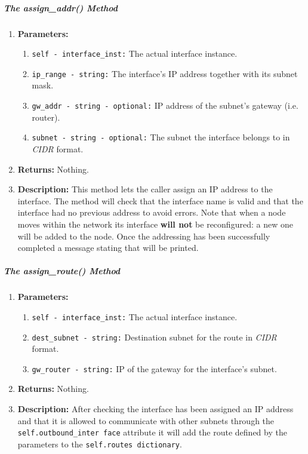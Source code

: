         \subparagraph{The assign\_addr() Method}
            \begin{enumerate}
                \item \textbf{Parameters:}
                \begin{enumerate}
                    \item \texttt{self - interface\_inst:} The actual interface instance.
                    \item \texttt{ip\_range - string:} The interface's IP address together with its subnet mask.
                    \item \texttt{gw\_addr - string - optional:} IP address of the subnet's gateway (i.e. router).
                    \item \texttt{subnet - string - optional:} The subnet the interface belongs to in \textit{CIDR} format.
                \end{enumerate}
                \item \textbf{Returns:} Nothing.
                \item \textbf{Description:} This method lets the caller assign an IP address to the interface. The method will check that the interface name is valid and that the interface had no previous address to avoid errors. Note that when a node moves within the network its interface \textbf{will not} be reconfigured: a new one will be added to the node. Once the addressing has been successfully completed a message stating that will be printed.
            \end{enumerate}

        \subparagraph{The assign\_route() Method}
            \begin{enumerate}
                \item \textbf{Parameters:}
                \begin{enumerate}
                    \item \texttt{self - interface\_inst:} The actual interface instance.
                    \item \texttt{dest\_subnet - string:} Destination subnet for the route in \textit{CIDR} format.
                    \item \texttt{gw\_router - string:} IP of the gateway for the interface's subnet.
                \end{enumerate}
                \item \textbf{Returns:} Nothing.
                \item \textbf{Description:} After checking the interface has been assigned an IP address and that it is allowed to communicate with other subnets through the \texttt{self.outbound\_inter face} attribute it will add the route defined by the parameters to the \texttt{self.routes dictionary}.
            \end{enumerate}

